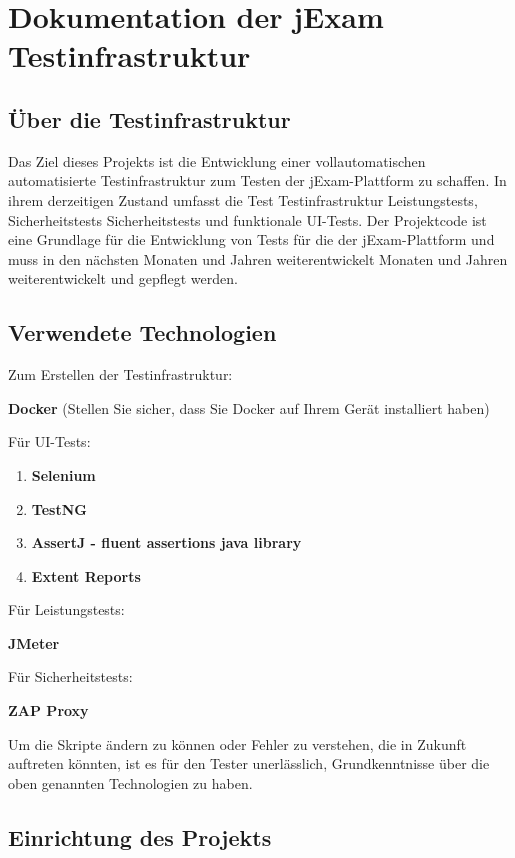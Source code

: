 \section{Dokumentation der jExam Testinfrastruktur}

\subsection{Über die Testinfrastruktur}

Das Ziel dieses Projekts ist die Entwicklung einer
vollautomatischen automatisierte Testinfrastruktur
zum Testen der jExam-Plattform zu schaffen. In ihrem
derzeitigen Zustand umfasst die Test Testinfrastruktur
Leistungstests, Sicherheitstests Sicherheitstests
und funktionale UI-Tests. Der Projektcode ist eine
Grundlage für die Entwicklung von Tests für die der
jExam-Plattform und muss in den nächsten Monaten und
Jahren weiterentwickelt Monaten und Jahren
weiterentwickelt und gepflegt werden.

\subsection{Verwendete Technologien}

Zum Erstellen der Testinfrastruktur:

\textbf{Docker} (Stellen Sie sicher, dass Sie
Docker auf Ihrem Gerät installiert haben)


Für UI-Tests:
\begin{enumerate}
    \item \textbf{Selenium}
    \item \textbf{TestNG}
    \item \textbf{AssertJ - fluent assertions java library}
    \item \textbf{Extent Reports}

\end{enumerate}

Für Leistungstests:

\textbf{JMeter}

Für Sicherheitstests:

\textbf{ZAP Proxy}

Um die Skripte ändern zu können oder Fehler zu
verstehen, die in Zukunft auftreten könnten, ist
es für den Tester unerlässlich, Grundkenntnisse
über die oben genannten Technologien zu haben.

\subsection{Einrichtung des Projekts}

